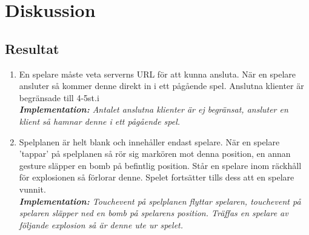 \documentclass[10pt, titlepage, oneside, a4paper]{article}
\begin{document}
   
   	

    \newpage
    \section{Diskussion}
    	\subsection{Resultat}
    	
    	\begin{enumerate}
			\item En spelare måste veta serverns URL för att kunna ansluta. När en spelare ansluter så kommer denne direkt in i ett pågående spel. Anslutna klienter är begränsade till 4-5st.i\\\textit{\textbf{Implementation:} Antalet anslutna klienter är ej begränsat, ansluter en klient så hamnar denne i ett pågående spel.}
			
			\item Spelplanen är helt blank och innehåller endast spelare. När en spelare 'tappar' på spelplanen så rör sig markören mot denna position, en annan gesture släpper en bomb på befintlig position. Står en spelare inom räckhåll för explosionen så förlorar denne. Spelet fortsätter tills dess att en spelare vunnit.\\\textit{\textbf{Implementation:} Touchevent på spelplanen flyttar spelaren, touchevent på spelaren släpper ned en bomb på spelarens position. Träffas en spelare av följande explosion så är denne ute ur spelet.}
			

\end{enumerate}
\end{document}
